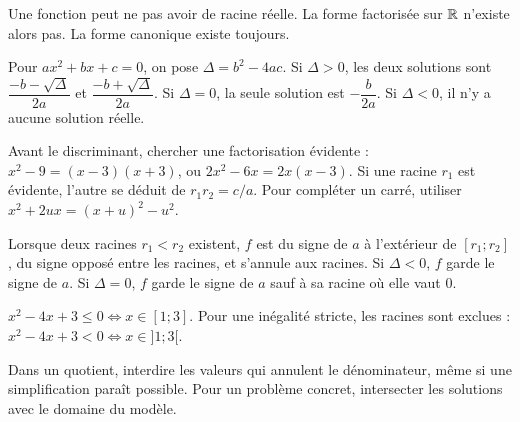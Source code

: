 \begin{attention}
Une fonction peut ne pas avoir de racine réelle. La forme factorisée sur $\mathbb{R}$
n'existe alors pas. La forme canonique existe toujours.
\end{attention}
\clearpage
{}
\begin{theoreme}[Discriminant]
Pour $ax^2+bx+c=0$, on pose $\Delta=b^2-4ac$.
Si $\Delta>0$, les deux solutions sont $\dfrac{-b-\sqrt\Delta}{2a}$ et
$\dfrac{-b+\sqrt\Delta}{2a}$. Si $\Delta=0$, la seule solution est
$-\dfrac b{2a}$. Si $\Delta<0$, il n'y a aucune solution réelle.
\end{theoreme}
\begin{savoirfaire}
Avant le discriminant, chercher une factorisation évidente :
$x^2-9=(x-3)(x+3)$, ou $2x^2-6x=2x(x-3)$.
Si une racine $r_1$ est évidente, l'autre se déduit de $r_1r_2=c/a$.
Pour compléter un carré, utiliser $x^2+2ux=(x+u)^2-u^2$.
\end{savoirfaire}
\begin{propriete}
Lorsque deux racines $r_1<r_2$ existent, $f$ est du signe de $a$ à l'extérieur
de $[r_1;r_2]$, du signe opposé entre les racines, et s'annule aux racines.
Si $\Delta<0$, $f$ garde le signe de $a$. Si $\Delta=0$, $f$ garde le signe
de $a$ sauf à sa racine où elle vaut 0.
\end{propriete}
\begin{center}\begin{tableau}
\end{tableau}\end{center}
\begin{savoirfaire}
$x^2-4x+3\leq0\iff x\in[1;3]$.
Pour une inégalité stricte, les racines sont exclues :
$x^2-4x+3<0\iff x\in]1;3[$.
\end{savoirfaire}
\begin{attention}
Dans un quotient, interdire les valeurs qui annulent le dénominateur,
même si une simplification paraît possible. Pour un problème concret,
intersecter les solutions avec le domaine du modèle.
\end{attention}
\exercices

